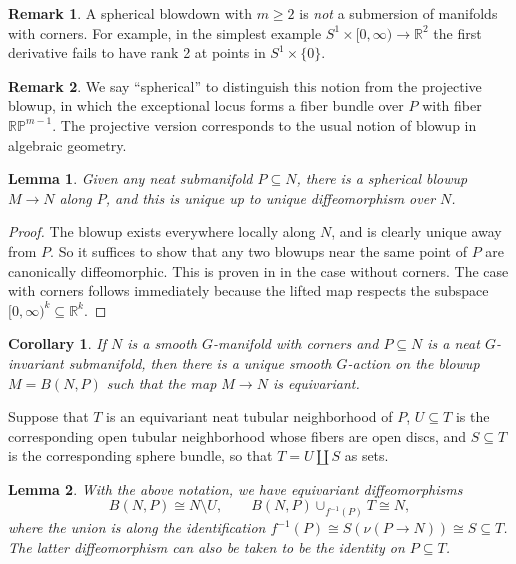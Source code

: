 \documentclass[11pt]{amsart}
\newtheorem{cor}{Corollary}[section]
\newtheorem{lem}{Lemma}[section]
\theoremstyle{definition}
\newtheorem{rem}{Remark}[section]
\numberwithin{equation}{section}
\numberwithin{figure}{section}
\newcommand{\R}{\mathbb R}
\begin{document}
\begin{rem}
	A spherical blowdown with $m \geq 2$ is \emph{not} a submersion of manifolds with corners. For example, in the simplest example $S^1 \times [0,\infty) \to \R^2$ the first derivative fails to have rank 2 at points in $S^1 \times \{0\}$.
\end{rem}

\begin{rem}
	We say ``spherical'' to distinguish this notion from the projective blowup, in which the exceptional locus forms a fiber bundle over $P$ with fiber $\mathbb{RP}^{m-1}$. The projective version corresponds to the usual notion of blowup in algebraic geometry.
\end{rem}

\begin{lem}
	Given any neat submanifold $P \subseteq N$, there is a spherical blowup $M \to N$ along $P$, and this is unique up to unique diffeomorphism over $N$.
\end{lem}

\begin{proof}
	The blowup exists everywhere locally along $N$, and is clearly unique away from $P$. So it suffices to show that any two blowups near the same point of $P$ are canonically diffeomorphic. This is proven in \cite[Lemma 2.5]{arone_kankaanrinta} in the case without corners. The case with corners follows immediately because the lifted map respects the subspace $[0,\infty)^k \subseteq \R^k$.
%	
%	
\end{proof}

\begin{cor}\label{blowup_g_action}
	If $N$ is a smooth $G$-manifold with corners and $P \subseteq N$ is a neat $G$-invariant submanifold, then there is a unique smooth $G$-action on the blowup $M = B(N,P)$ such that the map $M \to N$ is equivariant.
\end{cor}

Suppose that $T$ is an equivariant neat tubular neighborhood of $P$, $U \subseteq T$ is the corresponding open tubular neighborhood whose fibers are open discs, and $S \subseteq T$ is the corresponding sphere bundle, so that $T = U \amalg S$ as sets.

\begin{lem}\label{blowup_removes_tubular_neighborhood}
	With the above notation, we have equivariant diffeomorphisms
	\[ B(N,P) \cong N \setminus U, \qquad B(N,P) \cup_{f^{-1}(P)} T \cong N, \]
	where the union is along the identification $f^{-1}(P) \cong S(\nu(P \to N)) \cong S \subseteq T$. The latter diffeomorphism can also be taken to be the identity on $P \subseteq T$.
\end{lem}
\end{document}
